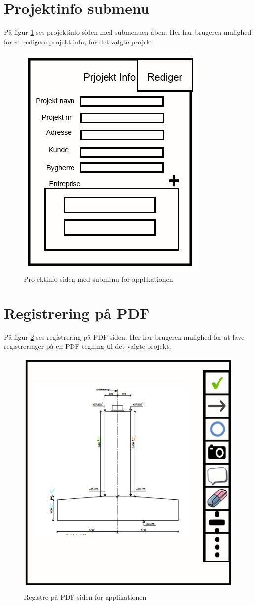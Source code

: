 \section{Projektinfo submenu}\label{sec:ProjektinfoSubMock}
På figur \ref{fig:ProjektinfoSubMock} ses projektinfo siden med submenuen åben. Her har brugeren mulighed for at redigere projekt info, for det valgte projekt

\begin{figure}[H]
	\centering
	\includegraphics[width=0.4\linewidth]{MockUps/Mock/Ramboell-ProjektInfo-Sub}
	\caption{Projektinfo siden med submenu for applikationen}
	\label{fig:ProjektinfoSubMock}
\end{figure}

\clearpage

\section{Registrering på PDF}\label{sec:RegPaaPDFMock}
På figur \ref{fig:RegPaaPDFMock} ses registrering på PDF siden. Her har brugeren mulighed for at lave registreringer på en PDF tegning til det valgte projekt.

\begin{figure}[H]
	\centering
	\includegraphics[width=0.4\linewidth]{MockUps/Mock/Ramboell-PDF-Reg}
	\caption{Registre på PDF siden for applikationen}
	\label{fig:RegPaaPDFMock}
\end{figure}



